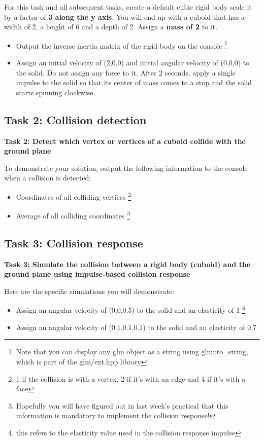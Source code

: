 \documentclass[12pt]{article}
\begin{document}
For this task and all subsequent tasks, create a default cubic rigid body scale it by a
factor of \textbf{3 along the y axis}. You will end up with a cuboid that has a width of 2, a height of
6 and a depth of 2. Assign a \textbf{mass of 2} to it.

\begin{itemize}
\item Output the inverse inertia matrix of the rigid body on the console \footnote{Note that you can display any glm object as a string using glm::to\_string, which is part of the glm/ext.hpp library}
\item Assign an initial velocity of (2,0,0) and initial angular velocity of (0,0,0) to the solid. Do not assign any force to it. After 2 seconds, apply a single impulse to the solid so that its center of mass comes to a stop and the solid starts spinning clockwise. 
\end{itemize}

\subsection*{Task 2: Collision detection}

\textbf{Task 2: Detect which vertex or vertices of a cuboid collide with the ground plane}

To demonstrate your solution, output the following information to the console when a collision is detected:
\begin{itemize}
\item Coordinates of all colliding vertices \footnote{1 if the collision is with a vertex, 2 if it’s with an edge and 4 if it’s with a face}
\item Average of all colliding coordinates \footnote{Hopefully you will have figured out in last week’s practical that this information is mandatory to implement the collision response!}
\end{itemize}

\subsection*{Task 3: Collision response}

\textbf{Task 3: Simulate the collision between a rigid body (cuboid) and the ground plane using impulse-based collision response}

Here are the specific simulations you will demonstrate:

\begin{itemize}
\item Assign an angular velocity of (0,0,0.5) to the solid and an elasticity of 1 \footnote{this refers to the elasticity value used in the collision response impulse}
\item Assign an angular velocity of (0.1,0.1,0.1) to the solid and an elasticity of 0.7
\end{itemize}
\end{document}
